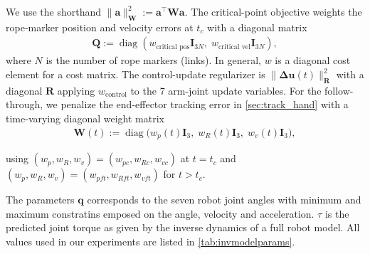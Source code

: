 \documentclass[conference]{IEEEtran}
\newcommand{\commandupdate}{\mathbf{\Delta u}(t)}
\begin{document}
We use the shorthand $\|\mathbf{a}\|_{\mathbf{W}}^2 := \mathbf{a}^\top \mathbf{W}\mathbf{a}$. The critical-point objective weights the rope-marker position and velocity errors at $t_c$ with a diagonal matrix
\begin{align*}
    \mathbf{Q} := \operatorname{diag}\!\left(w_{\text{critical pos}}\mathbf{I}_{3N},\; w_{\text{critical vel}}\mathbf{I}_{3N}\right),
\end{align*}
where $N$ is the number of rope markers (links). In general, $w$ is a diagonal cost element for a cost matrix. The control-update regularizer is $\|\commandupdate\|_{\mathbf{R}}^2$ with a diagonal $\mathbf{R}$ applying $w_{\text{control}}$ to the 7 arm-joint update variables. For the follow-through, we penalize the end-effector tracking error in \cref{sec:track_hand} with a time-varying diagonal weight matrix
\begin{align*}
    \mathbf{W}(t) := \operatorname{diag}\!\bigl(w_p(t)\mathbf{I}_3,\; w_R(t)\mathbf{I}_3,\; w_v(t)\mathbf{I}_3\bigr),
\end{align*}





using $(w_p,w_R,w_v)=(w_{pc},w_{Rc},w_{vc})$ at $t=t_c$ and $(w_p,w_R,w_v)=(w_{pft},w_{Rft},w_{vft})$ for $t>t_c$. 

The parameters $\mathbf{q}$ corresponds to the seven robot joint angles with minimum and maximum constratins emposed on the angle, velocity and acceleration. $\tau$ is the predicted joint torque as given by the inverse dynamics of a full robot model. 
All values used in our experiments are listed in \cref{tab:invmodelparams}.
\end{document}
